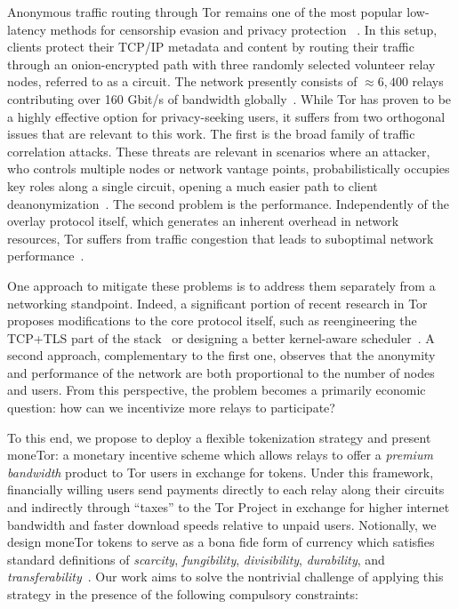 Anonymous traffic routing through Tor remains one of the most popular low-latency methods for censorship evasion and privacy protection ~\cite{dingledine2004tor}.
In this setup, clients protect their TCP/IP metadata and content by routing their traffic through an onion-encrypted path with three randomly selected volunteer relay nodes, referred to as a circuit.
The network presently consists of $\approx 6,400$ relays contributing over 160 Gbit/s of bandwidth globally~\cite{portal2018tormetrics}.
While Tor has proven to be a highly effective option for privacy-seeking users, it suffers from two orthogonal issues that are relevant to this work.
The first is the broad family of traffic correlation attacks.
These threats are relevant in scenarios where an attacker, who controls multiple nodes or network vantage points, probabilistically occupies key roles along a single circuit, opening a much easier path to client deanonymization~\cite{wright2004predecessor,murdoch2005low}.
The second problem is the performance.
Independently of the overlay protocol itself, which generates an inherent overhead in network resources, Tor suffers from traffic congestion that leads to suboptimal network performance~\cite{portal2018tormetrics, alsabah2016performance}.

One approach to mitigate these problems is to address them separately from a networking standpoint.
Indeed, a significant portion of recent research in Tor proposes modifications to the core protocol itself, such as reengineering the TCP+TLS part of the stack~\cite{reardon2009improving} or designing a better kernel-aware scheduler~\cite{jansen2014never}.
A second approach, complementary to the first one, observes that the anonymity and performance of the network are both proportional to the number of nodes and users.
From this perspective, the problem becomes a primarily economic question: how can we incentivize more relays to participate?

To this end, we propose to deploy a flexible tokenization strategy and present moneTor: a monetary incentive scheme which allows relays to offer a \emph{premium bandwidth} product to Tor users in exchange for tokens.
Under this framework, financially willing users send payments directly to each relay along their circuits and indirectly through ``taxes'' to the Tor Project in exchange for higher internet bandwidth and faster download speeds relative to unpaid users.
Notionally, we design moneTor tokens to serve as a bona fide form of currency which satisfies standard definitions of \textit{scarcity}, \textit{fungibility}, \textit{divisibility}, \textit{durability}, and \textit{transferability}~\cite[p.3]{crump2011phenomenon}.
Our work aims to solve the nontrivial challenge of applying this strategy in the presence of the following compulsory constraints:

